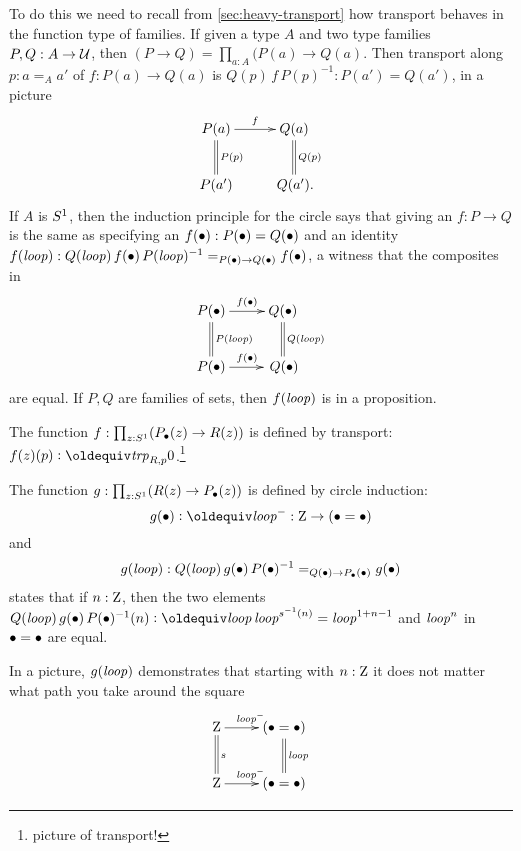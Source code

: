 To do this we need to recall from \cref{sec:heavy-transport} how transport behaves in the function type of families.  If given a type $A$ and two type families $P,Q:A\to\mathcal{U}$, then $(P\to Q)= \prod_{a:A}(P(a)\to Q(a)$.  Then transport along $p:a=_Aa'$ of $f:P(a)\to Q(a)$ is $Q(p)\,f\,P(p)^{-1}:P(a')=Q(a')$, in a picture
$$\xymatrix{
P(a)\ar[r]^{f}\ar@{=}[d]^{P(p)}&Q(a)\ar@{=}[d]^{Q(p)}\\
  P(a')&\,Q(a').}
$$
If $A$ is $S^1$, then the induction principle for the circle says that giving an $f:P\to Q$ is the same as specifying an $f(\bullet):P(\bullet)=Q(\bullet)$ and an identity $f(\mathit{loop}):Q(\mathit{loop})\,f(\bullet)\,P(\mathit{loop})^{-1}=_{P(\bullet)\to Q(\bullet)}f(\bullet)$, \ie a witness that the composites in 
$$\xymatrix{
  P(\base)\ar[r]^{f(\base)}\ar@{=}[d]^{P(\Sloop)}&Q(\base)\ar@{=}[d]^{Q(\Sloop)}\\
  P(\base)\ar[r]^{f(\base)}&\,Q(\base)}
$$
are equal.  If $P,Q$ are families of sets, then $f(\mathit{loop})$ is in a proposition.


\begin{definition}
  \label{def:fPtoR}
  The function $f:\prod_{z:S^1}(P_\bullet(z)\to R(z))$ is defined by transport: $f(z)(p)\defequi\trp_{R,p}0$.\footnote{picture of transport!}
\end{definition}
\begin{definition}
  \label{def:gRtoP}The function $g:\prod_{z:S^1}(R(z)\to P_\bullet(z))$ is defined by circle induction: 
$$g(\base)\defequi \Sloop^-:\zet\to(\base=\base)$$ and 
$$g(\mathit{loop}): Q(\mathit{loop})\, g(\bullet)\,P(\bullet)^{-1}=_{Q(\bullet)\to P_\bullet(\bullet)}g(\bullet)$$ states that if $n:\mathrm{Z}$, then the two elements $Q(\Sloop)\, g(\base)\,P(\base)^{-1}(n)\defequi \Sloop\,\Sloop^{s^{-1}(n)}=\Sloop^{1+n-1}$ and $\mathit{loop}^n$ in $\bullet=\bullet$ are equal.
\end{definition}
In a picture, $g(\mathit{loop})$ demonstrates that starting with $n:\mathrm{Z}$ it does not matter what path you take around the square
$$\xymatrix{\zet\ar[r]^{\Sloop^-}\ar@{=}[d]^s&(\base=\base)\ar@{=}[d]^\Sloop\\
  \zet\ar[r]^{\Sloop^-}&(\base=\base)}
$$




